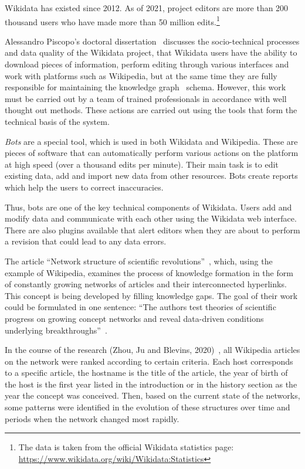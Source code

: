 Wikidata has existed since 2012. As of 2021, project editors are more than 200 thousand users who have made more than 50 million edits.\footnote{The data is taken from the official Wikidata statistics page: \href{https://www.wikidata.org/wiki/Wikidata:Statistics}{https://www.wikidata.org/wiki/Wikidata:Statistics}}

Alessandro Piscopo's doctoral dissertation~ discusses the socio-technical processes and data quality of the Wikidata project, that Wikidata users have the ability to download pieces of information, perform editing through various interfaces and work with platforms such as Wikipedia, but at the same time they are fully responsible for maintaining the knowledge graph~ schema. However, this work must be carried out by a team of trained professionals in accordance with well thought out methods. These actions are carried out using the tools that form the technical basis of the system.

\textit{Bots} are a special tool, which is used in both Wikidata and Wikipedia. These are pieces of software that can automatically perform various actions on the platform at high speed (over a thousand edits per minute). Their main task is to edit existing data, add and import new data from other resources. Bots create reports which help the users to correct inaccuracies.

Thus, bots are one of the key technical components of Wikidata. Users add and modify data and communicate with each other using the Wikidata web interface. There are also plugins available that alert editors when they are about to perform a revision that could lead to any data errors.

The article ``Network structure of scientific revolutions''~, which, using the example of Wikipedia, examines the process of knowledge formation in the form of constantly growing networks of articles and their interconnected hyperlinks. This concept is being developed by filling knowledge gaps. The goal of their work could be formulated in one sentence: ``The authors test theories of scientific progress on growing concept networks and reveal data-driven conditions underlying breakthroughs''~.

In the course of the research (Zhou, Ju and Blevins, 2020)~, all Wikipedia articles on the network were ranked according to certain criteria. Each host corresponds to a specific article, the hostname is the title of the article, the year of birth of the host is the first year listed in the introduction or in the history section as the year the concept was conceived. Then, based on the current state of the networks, some patterns were identified in the evolution of these structures over time and periods when the network changed most rapidly.

